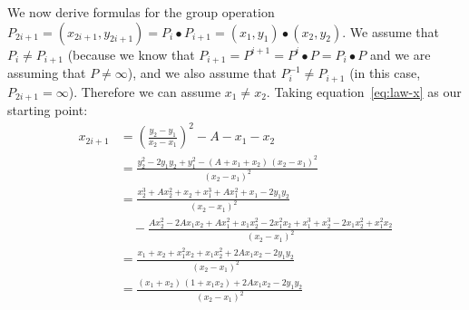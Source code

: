\documentclass[manuscript]{acmart}
\begin{document}
We now derive formulas for the group operation
$P_{2i+1} = (x_{2i+1}, y_{2i+1}) = P_i \bullet P_{i+1} = (x_1, y_1) \bullet (x_2, y_2)$.
We assume that $P_i \ne P_{i+1}$ (because we know that $P_{i+1} = P^{i+1} = P^i \bullet P = P_i \bullet P$ and we are assuming that $P \ne \infty$), and we also assume that $P_i^{-1} \ne P_{i+1}$ (in this case, $P_{2i+1} = \infty$).
Therefore we can assume $x_1 \neq x_2$.
Taking equation~\eqref{eq:law-x} as our starting point:
\begin{align}
x_{2i+1} &= \left(\frac{y_2 - y_1}{x_2 - x_1}\right)^2 - A - x_1 - x_2 \nonumber\\[5pt]
&= \frac{y_2^2 - 2y_1 y_2 + y_1^2 - (A + x_1 + x_2)\,(x_2 - x_1)^2}{(x_2 - x_1)^2} \nonumber\\[5pt]
&= \frac{x_2^3 + Ax_2^2 + x_2 + x_1^3 + Ax_1^2 + x_1 - 2y_1 y_2}{(x_2 - x_1)^2} \nonumber\\
    &\quad - \frac{Ax_2^2 - 2Ax_1 x_2 + Ax_1^2 + x_1 x_2^2 - 2 x_1^2 x_2 + x_1^3 + x_2^3 - 2x_1 x_2^2 + x_1^2 x_2}{(x_2 - x_1)^2} \nonumber\\[5pt]
&= \frac{x_1 + x_2 + x_1^2 x_2 + x_1 x_2^2 + 2A x_1 x_2 - 2y_1 y_2}{(x_2 - x_1)^2} \nonumber\\[5pt]
&= \frac{(x_1 + x_2)\,(1 + x_1 x_2) + 2A x_1 x_2 - 2y_1 y_2}{(x_2 - x_1)^2} \label{eq:add-x}
\end{align}
\end{document}
